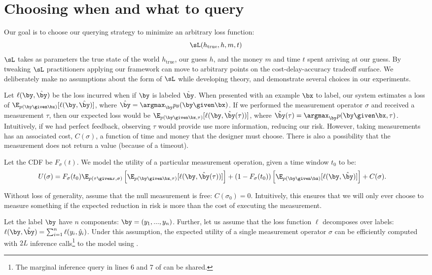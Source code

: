 \section{Choosing when and what to query}
\label{sec:async}

Our goal is to choose our querying strategy to minimize an arbitrary loss function:
\[\sL(h_{\text{true}}, h, m, t)\]
$\sL$ takes as parameters the true state of the world $h_{\text{true}}$, our guess $h$, and the money $m$ and time $t$ spent arriving at our guess.
 By tweaking $\sL$ practitioners applying our framework can move to arbitrary points on the cost-delay-accuracy tradeoff surface.
 We deliberately make no assumptions about the form of $\sL$ while developing theory, and demonstrate several choices in our experiments.

Let $\ell(\by, \byt)$ be the loss incurred when if $\by$ is labeled $\byt$.
When presented with an example $\bx$ to label, our system estimates a loss of $\E_{p(\by \given \bx)}[\ell(\by, \byt)]$, where $\byt = \argmax_{\by} \p(\by \given \bx)$.
If we performed the measurement operator $\sigma$ and received a measurement $\tau$,
then our expected loss would be $\E_{p(\by \given \bx, \tau)}[\ell(\by, \byt(\tau))]$, where $\byt(\tau) = \argmax_{\by} p(\by \given \bx, \tau)$.
Intuitively, if we had perfect feedback, observing $\tau$ would provide use more information, reducing our risk.
However, taking measurements has an associated cost, $C(\sigma)$, a function of time and money that the designer must choose.
There is also a possibility that the measurement does not return a value (because of a timeout).

Let the CDF be $F_\sigma(t)$.
We model the utility of a particular measurement operation, given a time window $t_0$ to be:
\begin{align*}
U(\sigma)
&= F_\sigma(t_0) 
  \E_{p(\tau \given x, \sigma)} \left[\E_{p(\by \given \bx, \tau)}[\ell(\by, \byt(\tau))] \right]
  + (1 - F_\sigma(t_0)) 
    \left[\E_{p(\by \given \bx)}[\ell(\by, \byt)] \right]
  + C(\sigma).
\end{align*}

Without loss of generality, assume that the null measurement is free: $C(\sigma_0) = 0$.
Intuitively, this ensures that we will only ever choose to measure something if the expected reduction in risk is more than the cost of executing the measurement.

Let the label $\by$ have $n$ components: $\by = (y_1, ..., y_n)$.
Further, let us assume that the loss function $\ell$ decomposes over labels: $\ell(\by, \byt) = \sum_{i=1}^n \ell(y_i, \yt_i)$. 
Under this assumption, the expected utility of a single measurement operator $\sigma$ can be efficiently computed with $2L$ inference calls\footnote{The marginal inference query in lines 6 and 7 of  can be shared.} to the model using .

